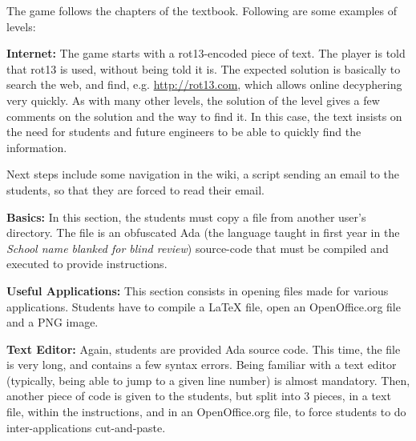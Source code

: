 \documentclass{sig-alternate}
\newcommand{\ensimag}[0]{\textit{School name blanked for blind review}}
\newcommand{\ensimag}[0]{Ensimag}
\begin{document}
The game follows the chapters of the textbook. Following are some
examples of levels:

\renewcommand{\subsubsection}[1]{\textbf{#1:}}
\subsubsection{Internet}
The game starts with a rot13-encoded piece of text. The player is told
that rot13 is used, without being told it is. The expected solution
is basically to search the web, and find, e.g. \url{http://rot13.com},
which allows online decyphering very quickly. As with many other
levels, the solution of the level gives a few comments on the solution
and the way to find it. In this case, the text insists on the need for
students and future engineers to be able to quickly find the
information.

Next steps include some navigation in the wiki, a script sending an
email to the students, so that they are forced to read their email.

\subsubsection{Basics}
In this section, the students must copy a file from another user's
directory. The file is an obfuscated Ada (the language taught in
first year in the \ensimag{}) source-code that must be
compiled and executed to provide instructions.

\subsubsection{Useful Applications}
This section consists in opening files made for various applications.
Students have to compile a \LaTeX{} file, open an OpenOffice.org file
and a PNG image.

\subsubsection{Text Editor}
Again, students are provided Ada source code. This time, the file is
very long, and contains a few syntax errors. Being familiar with a
text editor (typically, being able to jump to a given line number) is
almost mandatory. Then, another piece of code is given to the
students, but split into 3 pieces, in a text file, within the
instructions, and in an OpenOffice.org file, to force students to do
inter-applications cut-and-paste.
\end{document}

